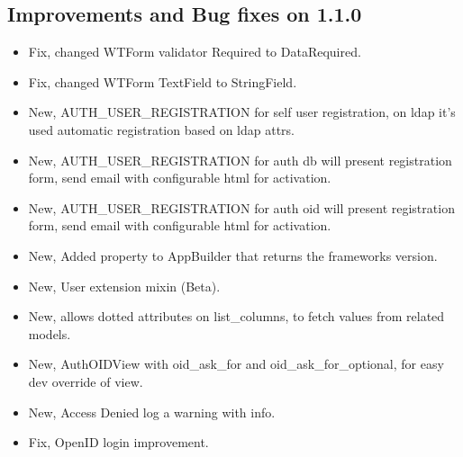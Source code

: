 \documentclass[letterpaper,10pt,english]{sphinxmanual}
\begin{document}
\subsection{Improvements and Bug fixes on 1.1.0}
\label{versions:improvements-and-bug-fixes-on-1-1-0}\begin{itemize}
\item {} 
Fix, changed WTForm validator Required to DataRequired.

\item {} 
Fix, changed WTForm TextField to StringField.

\item {} 
New, AUTH\_USER\_REGISTRATION for self user registration, on ldap it's used automatic registration based on ldap attrs.

\item {} 
New, AUTH\_USER\_REGISTRATION for auth db will present registration form, send email with configurable html for activation.

\item {} 
New, AUTH\_USER\_REGISTRATION for auth oid will present registration form, send email with configurable html for activation.

\item {} 
New, Added property to AppBuilder that returns the frameworks version.

\item {} 
New, User extension mixin (Beta).

\item {} 
New, allows dotted attributes on list\_columns, to fetch values from related models.

\item {} 
New, AuthOIDView with oid\_ask\_for and oid\_ask\_for\_optional, for easy dev override of view.

\item {} 
New, Access Denied log a warning with info.

\item {} 
Fix, OpenID login improvement.

\end{itemize}
\end{document}
